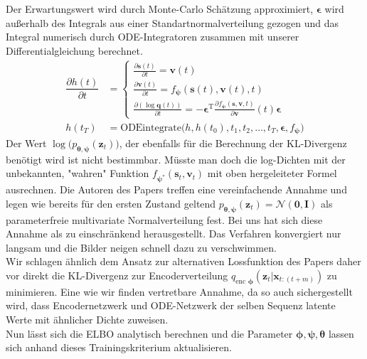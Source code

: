 \documentclass[12pt]{article}
\begin{document}
	Der Erwartungswert wird durch Monte-Carlo Schätzung approximiert, $\boldsymbol\epsilon$ wird außerhalb des Integrals aus einer Standartnormalverteilung gezogen und das Integral numerisch durch ODE-Integratoren zusammen mit unserer Differentialgleichung berechnet.\\
	\begin{align*}
	\dfrac{\partial h(t)}{\partial t}&=\begin{cases*}
	\tfrac{\partial \mathbf{s}(t)}{\partial t}=\mathbf v(t) \\
	\tfrac{\partial \mathbf{v}(t)}{\partial t}=f_{\boldsymbol{\psi}}(\mathbf s(t), \mathbf v(t), t) \\
	\tfrac{\partial (\log\mathbf{q}(t))}{\partial t}= -\boldsymbol\epsilon^\mathrm{T}\tfrac{\partial f_{\boldsymbol\psi}(\mathbf{s},\mathbf{v},t)}{\partial\mathbf{v}}(t)\boldsymbol\epsilon
	\end{cases*}\\ h(t_T)&=\text{ODEintegrate}\big(h,h(t_0),t_1,t_2,\ldots,t_T,\boldsymbol\epsilon,f_{\boldsymbol\psi}\big)
	\end{align*}
	Der Wert
	$\log\big(p_{\boldsymbol\theta,\boldsymbol\psi}(\mathbf{z}_{t}) \big)$, der ebenfalls für die Berechnung der KL-Divergenz benötigt wird ist nicht bestimmbar. Müsste man doch die log-Dichten mit der unbekannten, "wahren" Funktion $f_{\boldsymbol\psi^{*}}(\mathbf{s}_{t},\mathbf{v}_{t})$ mit oben hergeleiteter Formel ausrechnen.
	Die Autoren des Papers treffen eine vereinfachende Annahme und legen wie bereits für den ersten Zustand geltend $p_{\boldsymbol\theta,\boldsymbol\psi}(\mathbf{z}_{t}) = \mathcal{N}(\mathbf{0},\mathbf{I})$ als parameterfreie multivariate Normalverteilung fest.
	Bei uns hat sich diese Annahme als zu einschränkend herausgestellt. Das Verfahren konvergiert nur langsam und die Bilder neigen schnell dazu zu verschwimmen. \\
	Wir schlagen ähnlich dem Ansatz zur alternativen Lossfunktion des Papers daher vor direkt die KL-Divergenz zur Encoderverteilung $q_{\text{enc }\boldsymbol\phi}(\mathbf{z}_{t}|\mathbf{x}_{t:(t+m)})$ zu minimieren. Eine wie wir finden vertretbare Annahme, da so auch sichergestellt wird, dass Encodernetzwerk und ODE-Netzwerk der selben Sequenz latente Werte mit ähnlicher Dichte zuweisen.\\
	Nun lässt sich die ELBO analytisch berechnen und die Parameter $\boldsymbol\phi,\boldsymbol\psi,\boldsymbol\theta$ lassen sich anhand dieses Trainingskriterium aktualisieren.\\
\end{document}
